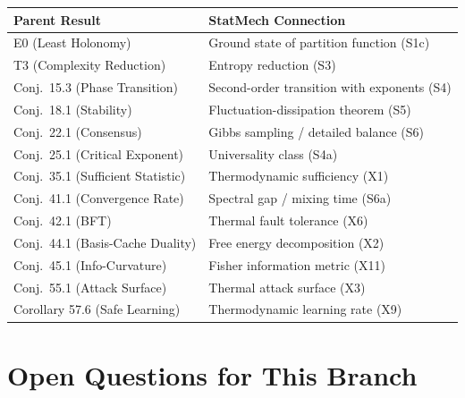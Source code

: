 \documentclass[11pt,letterpaper]{article}
\begin{document}
\begin{center}
\renewcommand{\arraystretch}{1.3}
\begin{tabular}{ll}
\textbf{Parent Result} & \textbf{StatMech Connection} \\
\hline
E0 (Least Holonomy) & Ground state of partition function (S1c) \\
T3 (Complexity Reduction) & Entropy reduction (S3) \\
Conj.\ 15.3 (Phase Transition) & Second-order transition with exponents (S4) \\
Conj.\ 18.1 (Stability) & Fluctuation-dissipation theorem (S5) \\
Conj.\ 22.1 (Consensus) & Gibbs sampling / detailed balance (S6) \\
Conj.\ 25.1 (Critical Exponent) & Universality class (S4a) \\
Conj.\ 35.1 (Sufficient Statistic) & Thermodynamic sufficiency (X1) \\
Conj.\ 41.1 (Convergence Rate) & Spectral gap / mixing time (S6a) \\
Conj.\ 42.1 (BFT) & Thermal fault tolerance (X6) \\
Conj.\ 44.1 (Basis-Cache Duality) & Free energy decomposition (X2) \\
Conj.\ 45.1 (Info-Curvature) & Fisher information metric (X11) \\
Conj.\ 55.1 (Attack Surface) & Thermal attack surface (X3) \\
Corollary 57.6 (Safe Learning) & Thermodynamic learning rate (X9) \\
\end{tabular}
\end{center}

\section{Open Questions for This Branch}
\end{document}
